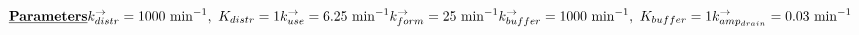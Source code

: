 \documentclass[10pt]{article}
\begin{document}
\[\ \ \ \underline{\textbf{Parameters}}\\
k^{\rightarrow}_{distr} = 1000\ \text{min}^{-1},\ K_{distr} = 1\\
k^{\rightarrow}_{use} = 6.25\ \text{min}^{-1}\\
k^{\rightarrow}_{form} = 25\ \text{min}^{-1}\\
k^{\rightarrow}_{buffer} = 1000\ \text{min}^{-1},\ K_{buffer} = 1\\
k^{\rightarrow}_{amp_{drain}} = 0.03\ \text{min}^{-1}\\

\]
\end{document}
